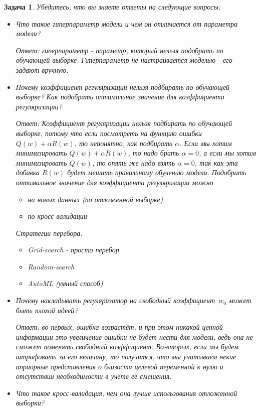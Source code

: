 \documentclass[12pt,fleqn]{article}
\newtheorem{esProblem}{Задача}
\begin{document}
\begin{esProblem}
    Убедитесь, что вы знаете ответы на следующие вопросы:
    \begin{itemize}
        \item Что такое гиперпараметр модели и чем он отличается от параметра модели?
        
        Ответ: гиперпараметр - параметр, который нельзя подобрать по обучающей выборке. Гиперпараметр не настраивается моделью - его задают вручную.
        \item Почему коэффициент регуляризации нельзя подбирать по обучающей выборке? Как подобрать оптимальное значение для коэффициента регуляризации? 
        
        Ответ: Коэффициент регуляризации нельзя подбирать по обучающей выборке, потому что если посмотреть на функцию ошибки $Q(w) + \alpha R(w)$, то непонятно, как подбирать $\alpha$. Если мы хотим минимизировать $Q(w) + \alpha R(w)$, то надо брать $\alpha = 0$, а если мы хотим минимизировать $Q(w)$, то опять же надо взять $\alpha = 0 $, так как эта добавка $R(w)$ будет мешать правильному обучению модели.
        Подобрать оптимальное значение для коэффициента регуляризации можно
        \begin{itemize}
        \item на новых данных (по отложенной выборке)
        \item по кросс-валидации
        \end{itemize}
        
        Стратегии перебора:
        \begin{itemize}
        \item Grid-search - просто перебор
        \item Random-search
        \item AutoML (умный способ)
        \end{itemize}
        \item Почему накладывать регуляризатор на свободный коэффициент~$w_0$ может быть плохой идеей?
        
        Ответ: во-первых, ошибка возрастёт, и при этом никакой ценной информации это увеличение ошибки не будет нести для модели, ведь она не сможет поменять свободный коэффициент. Во-вторых, если мы будем штрафовать за его величину, то получится, что мы учитываем некие
априорные представления о близости целевой переменной к нулю и отсутствии необходимости в учёте её смещения. 
        \item Что такое кросс-валидация, чем она лучше использования отложенной выборки?
        

\end{itemize}
\end{esProblem}
\end{document}
